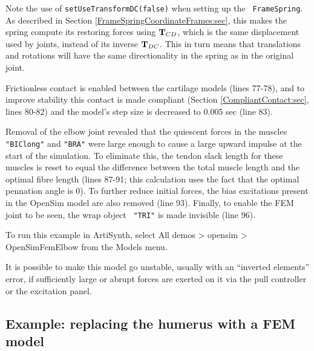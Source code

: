 \begin{sideblock}
Note the use of {\tt setUseTransformDC(false)} when setting up the {\tt
FrameSpring}. As described in Section \ref{FrameSpringCoordinateFrames:sec},
this makes the spring compute its restoring forces using ${\bf T}_{CD}$, which is
the same displacement used by joints, instead of its inverse ${\bf T}_{DC}$.  This
in turn means that translations and rotations will have the same directionality
in the spring as in the original joint.
\end{sideblock}

Frictionless contact is enabled between the cartilage models (lines 77-78), and
to improve stability this contact is made compliant
(Section \ref{CompliantContact:sec}, lines 80-82) and the model's step size is
decreased to 0.005 sec (line 83).

Removal of the elbow joint revealed that the quiescent forces in the muscles
{\tt "BIClong"} and {\tt "BRA"} were large enough to cause a large upward
impulse at the start of the simulation. To eliminate this, the tendon slack
length for these muscles is reset to equal the difference between the total
muscle length and the optimal fibre length (lines 87-91; this calculation uses
the fact that the optimal pennation angle is 0). To further reduce initial
forces, the bias excitations present in the OpenSim model are also removed
(line 93). Finally, to enable the FEM joint to be seen, the wrap object {\tt
"TRI"} is made invisible (line 96).

To run this example in ArtiSynth, select {\sf All demos > opensim >
OpenSimFemElbow} from the {\sf Models} menu.

\begin{sideblock}
It is possible to make this model go unstable, usually with an ``inverted
elements'' error, if sufficiently large or abrupt forces are exerted on it via
the pull controller or the excitation panel.
\end{sideblock}

\subsection{Example: replacing the humerus with a FEM model}
\label{OpenSimFemHumerus:sec}

